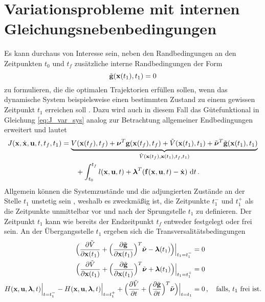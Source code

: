 \section{Variationsprobleme mit internen Gleichungsnebenbedingungen}\label{sec:InterneGNB}
Es kann durchaus von Interesse sein, neben den Randbedingungen an den Zeitpunkten $t_0$ und $t_f$ zusätzliche interne Randbedingungen der Form
\begin{equation}
	\tilde{\mathbf{g}}(\boldsymbol{\mathrm{x}}(t_1),t_1) = 0 \label{eq:NBt1}
\end{equation} zu formulieren, die die optimalen Trajektorien erfüllen sollen, wenn das dynamische System beispielsweise einen bestimmten Zustand zu einem gewissen Zeitpunkt $t_1$ erreichen soll \cite{Papageorgiou.2012}. Dazu wird auch in diesem Fall das Gütefunktional in Gleichung \eqref{eq:J_var_sys} analog zur Betrachtung allgemeiner Endbedingungen erweitert und lautet 
\begin{equation}
\begin{split}
J(\boldsymbol{\mathrm{x}},\dot{\boldsymbol{\mathrm{x}}},\boldsymbol{\mathrm{u}},t,t_f,t_1) &= \underbrace{V(\boldsymbol{\mathrm{x}}(t_f),t_f) + \boldsymbol{\mathrm{\nu}}^T\mathbf{g}(\boldsymbol{\mathrm{x}}(t_f),t_f) + \tilde{V}(\boldsymbol{\mathrm{x}}(t_1),t_1) + \tilde{\boldsymbol{\mathrm{\nu}}}^T\tilde{\mathbf{g}}(\boldsymbol{\mathrm{x}}(t_1),t_1)}_{\hat{V}(\boldsymbol{\mathrm{x}}(t_f),\boldsymbol{\mathrm{x}}(t_1),t_f,t_1)} \\
& \qquad +\int_{t_0}^{t_f}l(\boldsymbol{\mathrm{x}},\boldsymbol{\mathrm{u}},t) + \boldsymbol{\mathrm{\lambda}}^T(\boldsymbol{\mathrm{f}}(\boldsymbol{\mathrm{x}},\boldsymbol{\mathrm{u}},t) - \dot{\boldsymbol{\mathrm{x}}})~\textrm{d}{t}\,. \label{eq:J_var_sys_t1}
\end{split}
\end{equation}
Allgemein können die Systemzustände und die adjungierten Zustände an der Stelle $t_1$ unstetig sein \cite{Gerdts.2010}, weshalb es zweckmäßig ist, die Zeitpunkte $t_1^-$ und $t_1^+$ als die Zeitpunkte unmittelbar vor und nach der Sprungstelle $t_1$ zu definieren. Der Zeitpunkt $t_1$ kann wie bereits der Endzeitpunkt $t_f$ entweder festgelegt oder frei sein. An der Übergangsstelle $t_1$ ergeben sich die Transversalitätsbedingungen \cite{Gerdts.2010}
\begin{align}
\Big(\frac{\partial \tilde{V}}{\partial \boldsymbol{\mathrm{x}}(t_1)} + \Big(\frac{\partial \tilde{\mathbf{g}}}{\partial \boldsymbol{\mathrm{x}}(t_1)}\Big)^T\tilde{\boldsymbol{\mathrm{\nu}}} - \boldsymbol{\mathrm{\lambda}}(t_1)\Big)\Big|_{t_1=t_1^-} &= 0 \label{eq:Sprungbedingung1}\\
\Big(\frac{\partial \tilde{V}}{\partial \boldsymbol{\mathrm{x}}(t_1)} + \Big(\frac{\partial \tilde{\mathbf{g}}}{\partial \boldsymbol{\mathrm{x}}(t_1)}\Big)^T\tilde{\boldsymbol{\mathrm{\nu}}} + \boldsymbol{\mathrm{\lambda}}(t_1)\Big)\Big|_{t_1=t_1^+} &= 0 \label{eq:Sprungbedingung2}\\
H(\boldsymbol{\mathrm{x}},\boldsymbol{\mathrm{u}},\boldsymbol{\mathrm{\lambda}},t)\Big|_{t=t_1^-} - H(\boldsymbol{\mathrm{x}},\boldsymbol{\mathrm{u}},\boldsymbol{\mathrm{\lambda}},t)\Big|_{t=t_1^+} + \Big(\frac{\partial \tilde{V}}{\partial t}+\Big(\frac{\partial \tilde{\mathbf{g}}}{\partial t}\Big)^T\tilde{\boldsymbol{\mathrm{\nu}}}\Big)\Big|_{t=t_1}&= 0\,,\quad \textrm{falls, $t_1$ frei ist.}\label{eq:Transversalität_t1}
\end{align}
